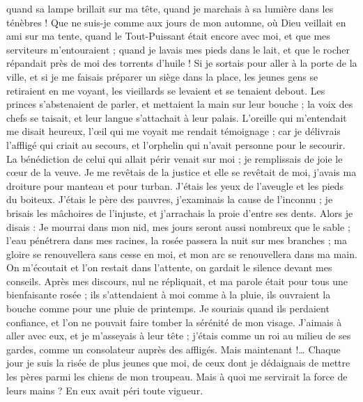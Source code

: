 \begin{multicols}{2}
quand sa lampe brillait sur ma tête, quand je marchais à sa lumière dans les ténèbres !
Que ne suis-je comme aux jours de mon automne, où Dieu veillait en ami sur ma tente,
quand le Tout-Puissant était encore avec moi, et que mes serviteurs m'entouraient ;
quand je lavais mes pieds dans le lait, et que le rocher répandait près de moi des torrents d'huile !
Si je sortais pour aller à la porte de la ville, et si je me faisais préparer un siège dans la place,
les jeunes gens se retiraient en me voyant, les vieillards se levaient et se tenaient debout.
Les princes s'abstenaient de parler, et mettaient la main sur leur bouche ;
la voix des chefs se taisait, et leur langue s'attachait à leur palais.
L'oreille qui m'entendait me disait heureux, l'œil qui me voyait me rendait témoignage ;
car je délivrais l'affligé qui criait au secours, et l'orphelin qui n'avait personne pour le secourir.
La bénédiction de celui qui allait périr venait sur moi ; je remplissais de joie le cœur de la veuve.
Je me revêtais de la justice et elle se revêtait de moi, j'avais ma droiture pour manteau et pour turban.
J'étais les yeux de l'aveugle et les pieds du boiteux.
J'étais le père des pauvres, j'examinais la cause de l'inconnu ;
je brisais les mâchoires de l'injuste, et j'arrachais la proie d'entre ses dents.
Alors je disais : Je mourrai dans mon nid, mes jours seront aussi nombreux que le sable ;
l'eau pénétrera dans mes racines, la rosée passera la nuit sur mes branches ;
ma gloire se renouvellera sans cesse en moi, et mon arc se renouvellera dans ma main.
On m'écoutait et l'on restait dans l'attente, on gardait le silence devant mes conseils.
Après mes discours, nul ne répliquait, et ma parole était pour tous une bienfaisante rosée ;
ils s'attendaient à moi comme à la pluie, ils ouvraient la bouche comme pour une pluie de printemps.
Je souriais quand ils perdaient confiance, et l'on ne pouvait faire tomber la sérénité de mon visage.
J'aimais à aller avec eux, et je m'asseyais à leur tête ; j'étais comme un roi au milieu de ses gardes, comme un consolateur auprès des affligés.
\VerseOne{}Mais maintenant !… Chaque jour je suis la risée de plus jeunes que moi, de ceux dont je dédaignais de mettre les pères parmi les chiens de mon troupeau.
Mais à quoi me servirait la force de leurs mains ? En eux avait péri toute vigueur.

\end{multicols}
